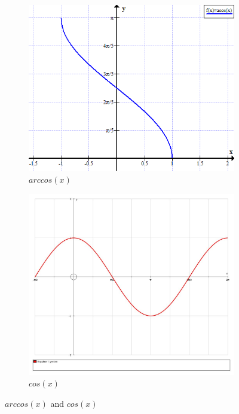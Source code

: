 \documentclass[10pt]{article}
\begin{document}
\begin{enumerate}
    \begin{figure}[h!]
      \centering
      \begin{subfigure}[b]{0.4\linewidth}
        \includegraphics[width=\linewidth]{image/arccos.png}
        \caption{$arccos(x)$}
      \end{subfigure}
      \begin{subfigure}[b]{0.4\linewidth}
        \includegraphics[width=\linewidth]{image/cos.jpg}
        \caption{$cos(x)$}
      \end{subfigure}
      \caption{$arccos(x)$ and $cos(x)$}
      \label{fig:coffee}
    \end{figure}


\end{enumerate}
\end{document}
